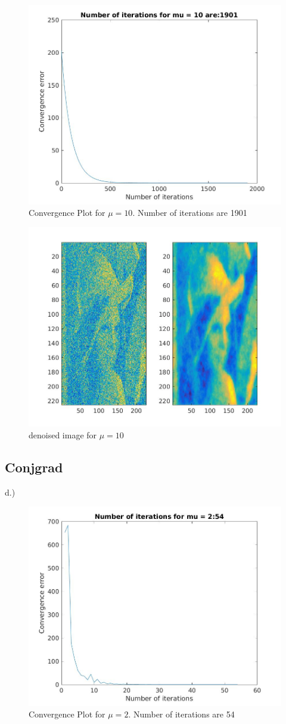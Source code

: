 \documentclass{article}
\begin{document}
\begin{figure}[H]
\centering
\includegraphics[width=0.5\linewidth]{richardson_10}
\caption{Convergence Plot for $\mu = 10$. Number of iterations are 1901}
\end{figure}

\begin{figure}[H]
\centering
\includegraphics[width=0.5\linewidth]{richardson_denoised_10.jpg}
\caption{denoised image for $\mu = 10$}
\end{figure}


\subsection{Conjgrad}
d.)

\begin{figure}[H]
\centering
\includegraphics[width=0.5\linewidth]{conjgrad_2}
\caption{Convergence Plot for $\mu = 2$. Number of iterations are 54}
\end{figure}
\end{document}
